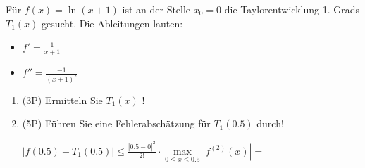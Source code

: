 Für $f(x) = \ln(x+1)$ ist an der Stelle $x_0=0$ die Taylorentwicklung 1. Grads $T_1(x)$ gesucht. Die Ableitungen lauten:

\begin{itemize}
	\item $f' = \frac{1}{x+1}$
	\item $f'' = \frac{-1}{(x+1)^2}$
\end{itemize}

\begin{enumerate}[label=(\alph*)]
		\item (3P) Ermitteln Sie $T_1(x)$ !
			\bigskip
			\bigskip
			\bigskip
			\bigskip
			\bigskip
			\bigskip
			\bigskip
			\bigskip
			\bigskip
			\bigskip
			\bigskip
			\bigskip
			\bigskip
			\bigskip
			\bigskip
			\bigskip

		\item (5P) Führen Sie eine Fehlerabschätzung für $T_1(0.5)$ durch!
		
		$|f(0.5) - T_1(0.5)| \le \frac{|0.5-0|^2}{2!} \cdot \max\limits_{0\le x \le 0.5} | f^{(2)}(x) | = $
		
\end{enumerate}